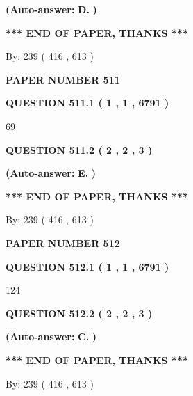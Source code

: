 \documentclass{ctexart}
\begin{document}
 
{\textbf{(Auto-answer:}}
{\textbf{\large{
D.}}}
{\textbf{)}}
 
 
   
   
   
   
\vspace{1.0in} 
{\textbf{\large{ *** END OF PAPER, THANKS *** }}} 
   
   
\hspace{1.0in} By: 
 239 ( 416 ,  613 )
   
   
   
   
\newpage 
\setcounter{page}{ 
   511001 } 
   
   
 {\textbf{ \Large{ PAPER NUMBER  511  }}}
   
   
   
   
  
  
{\textbf{\large{QUESTION
511.1 
 ( 1 , 1 , 6791 )
}}}

69
  
  
{\textbf{\large{QUESTION
511.2 
 ( 2 , 2 , 3 )
}}}
 
 
{\textbf{(Auto-answer:}}
{\textbf{\large{
E.}}}
{\textbf{)}}
 
 
   
   
   
   
\vspace{1.0in} 
{\textbf{\large{ *** END OF PAPER, THANKS *** }}} 
   
   
\hspace{1.0in} By: 
 239 ( 416 ,  613 )
   
   
   
   
\newpage 
\setcounter{page}{ 
   512001 } 
   
   
 {\textbf{ \Large{ PAPER NUMBER  512  }}}
   
   
   
   
  
  
{\textbf{\large{QUESTION
512.1 
 ( 1 , 1 , 6791 )
}}}

124
  
  
{\textbf{\large{QUESTION
512.2 
 ( 2 , 2 , 3 )
}}}
 
 
{\textbf{(Auto-answer:}}
{\textbf{\large{
C.}}}
{\textbf{)}}
 
 
   
   
   
   
\vspace{1.0in} 
{\textbf{\large{ *** END OF PAPER, THANKS *** }}} 
   
   
\hspace{1.0in} By: 
 239 ( 416 ,  613 )
   
   
   
\end{document}
